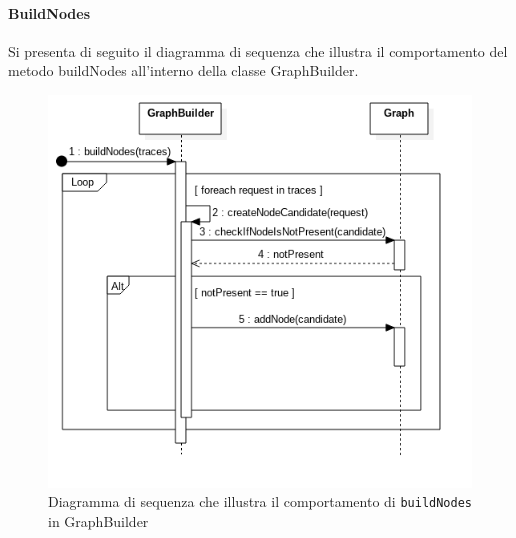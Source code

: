 \paragraph{BuildNodes} \Spazio
Si presenta di seguito il diagramma di sequenza che illustra il comportamento del metodo buildNodes all'interno della classe GraphBuilder.
\begin{figure}[H]
	\centering
	\includegraphics[width=1\textwidth]{Images/SequenceBuildNodes.png}
	\caption{Diagramma di sequenza che illustra il comportamento di \texttt{buildNodes} in GraphBuilder}
	\label{img:sequenceBuildNodes}
\end{figure}

